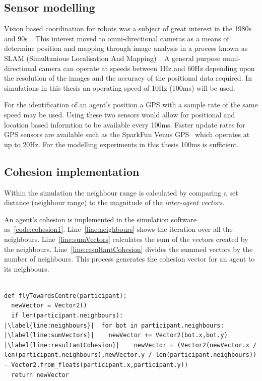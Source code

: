 \subsection{Sensor modelling}
Vision based coordination for robots was a subject of great interest in the 1980s and 90s~\cite{DK:02}. This interest moved to omni-directional cameras as a means of determine position and mapping through image analysis in a process known as SLAM (Simultanious Localisation And Mapping)~\cite{TRI:15,SG:15}. A general purpose omni-directional camera can operate at speeds between 1Hz and 60Hz depending upon the resolution of the images and the accuracy of the positional data required. In simulations in this thesis an operating speed of 10Hz (100ms) will be used. 

For the identification of an agent's position a GPS with a sample rate of the same speed may be used. Using these two sensors would allow for positional and location based informtion to be available every 100ms. Faster update rates for GPS sensors are available such as the SparkFun Venus GPS~\cite{SF:16} which operates at up to 20Hz. For the modelling experiments in this thesis 100ms is sufficient.

\subsection{Cohesion implementation}
Within the simulation the neighbour range is calculated by comparing a set distance (neighbour range) to the magnitude of the \textit{inter-agent vectors}.

An agent's cohesion is implemented in the simulation software as~\autoref{code:cohesion1}. Line~\autoref{line:neighbours} shows the iteration over all the neighbours. Line~\autoref{line:sumVectors} calculates the sum of the vectors created by the neighbours. Line~\autoref{line:resultantCohesion} divides the summed vectors by the number of neighbours. This process generates the cohesion vector for an agent to its neighbours.

\lstset{language=Python,
basicstyle=\tiny,
numbers=left, 
numberstyle=\tiny,
captionpos=b,
frame=single,
breaklines=true,
caption=Cohesion code,
escapechar=|
} %
\begin{lstlisting}[label={code:cohesion1}]  % Start your code-block

def flyTowardsCentre(participant):
  newVector = Vector2()
  if len(participant.neighbours):
|\label{line:neighbours}|  for bot in participant.neighbours:
|\label{line:sumVectors}|    newVector += Vector2(bot.x,bot.y)
|\label{line:resultantCohesion}|    newVector = (Vector2(newVector.x / len(participant.neighbours),newVector.y / len(participant.neighbours)) - Vector2.from_floats(participant.x,participant.y))
  return newVector
\end{lstlisting}

